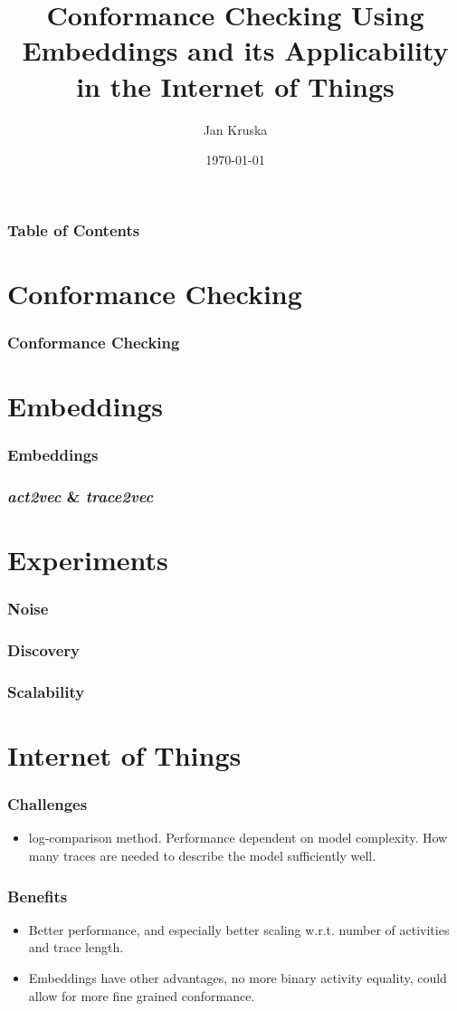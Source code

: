 \documentclass{beamer}
\title{Conformance Checking Using Embeddings and its Applicability in the Internet of Things}
\author{Jan Kruska}
\date{\today}
\begin{document}
\frame{\titlepage}

\begin{frame}
	\frametitle{Table of Contents}
	\tableofcontents
\end{frame}
\section{Conformance Checking}
\begin{frame}
	\frametitle{Conformance Checking}
\end{frame}

\section{Embeddings}
\begin{frame}
	\frametitle{Embeddings}
\end{frame}


\begin{frame}
	\frametitle{\emph{act2vec} \& \emph{trace2vec}}
\end{frame}

\section{Experiments}
\begin{frame}
	\frametitle{Noise}
\end{frame}


\begin{frame}
	\frametitle{Discovery}
\end{frame}


\begin{frame}
	\frametitle{Scalability}
\end{frame}

\section{Internet of Things}
\begin{frame}
	\frametitle{Challenges}
	\begin{itemize}
		\item log-comparison method. Performance dependent on model complexity. How many traces are needed to describe the model sufficiently well.
	\end{itemize}
\end{frame}

\begin{frame}
	\frametitle{Benefits}
	\begin{itemize}
		\item Better performance, and especially better scaling w.r.t. number of activities and trace length.
		\item Embeddings have other advantages, no more binary activity equality, could allow for more fine grained conformance.
	\end{itemize}
\end{frame}
\end{document}
